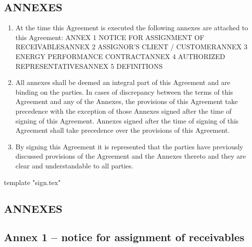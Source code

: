 \documentclass[a4paper]{article}
\begin{document}
\begin{multicols}{2}
  \subsection{ANNEXES}

  \begin{enumerate}
  \item{At the time this Agreement is executed the following
      annexes are attached to this Agreement: ANNEX 1 NOTICE FOR
      ASSIGNMENT OF RECEIVABLESANNEX 2 ASSIGNOR'S CLIENT /
      CUSTOMERANNEX 3 ENERGY PERFORMANCE CONTRACTANNEX 4 AUTHORIZED
      REPRESENTATIVESANNEX 5 DEFINITIONS}

  \item{All annexes shall be deemed an integral part of this Agreement
      and are binding on the parties. In cases of discrepancy between
      the terms of this Agreement and any of the Annexes, the
      provisions of this Agreement take precedence with the exception
      of those Annexes signed after the time of signing of this
      Agreement. Annexes signed after the time of signing of this
      Agreement shall take precedence over the provisions of this
      Agreement.}

  \item{By signing this Agreement it is represented that the parties
      have previously discussed provisions of the Agreement and the
      Annexes thereto and they are clear and understandable to all
      parties.}
  \end{enumerate}

\end{multicols}

\vspace{5mm}

{{template "sign.tex"}}

\begin{center}
  \section{ANNEXES}
\end{center}

\vspace{1cm}

\subsection{Annex 1 – notice for assignment of receivables}

\vspace{2mm}
\end{document}
